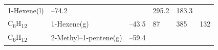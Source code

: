 \documentclass[
  9pt,
]{extbook}
\theoremstyle{definition}
\theoremstyle{definition}
\theoremstyle{definition}
\theoremstyle{remark}
\begin{document}
\begin{longtable}[]{@{}llllll@{}}
\begin{minipage}[t]{0.17\columnwidth}
1-Hexene(l)\strut
\end{minipage} & \begin{minipage}[t]{0.15\columnwidth}\raggedright
--74.2\strut
\end{minipage} & \begin{minipage}[t]{0.15\columnwidth}\raggedright
\strut
\end{minipage} & \begin{minipage}[t]{0.14\columnwidth}\raggedright
295.2\strut
\end{minipage} & \begin{minipage}[t]{0.14\columnwidth}\raggedright
183.3\strut
\end{minipage}\tabularnewline
\begin{minipage}[t]{0.07\columnwidth}\raggedright
C\textsubscript{6}H\textsubscript{12}\strut
\end{minipage} & \begin{minipage}[t]{0.17\columnwidth}\raggedright
1-Hexene(g)\strut
\end{minipage} & \begin{minipage}[t]{0.15\columnwidth}\raggedright
--43.5\strut
\end{minipage} & \begin{minipage}[t]{0.15\columnwidth}\raggedright
87\strut
\end{minipage} & \begin{minipage}[t]{0.14\columnwidth}\raggedright
385\strut
\end{minipage} & \begin{minipage}[t]{0.14\columnwidth}\raggedright
132\strut
\end{minipage}\tabularnewline
\begin{minipage}[t]{0.07\columnwidth}\raggedright
C\textsubscript{6}H\textsubscript{12}\strut
\end{minipage} & \begin{minipage}[t]{0.17\columnwidth}\raggedright
2-Methyl--1-pentene(g)\strut
\end{minipage} & \begin{minipage}[t]{0.15\columnwidth}\raggedright
--59.4\strut
\end{minipage} & \begin{minipage}[t]{0.15\columnwidth}\raggedright
\strut
\end{minipage} & \begin{minipage}[t]{0.14\columnwidth}\raggedright
\strut
\end{minipage} & \begin{minipage}[t]{0.14\columnwidth}\raggedright

\end{minipage}
\end{longtable}
\end{document}
